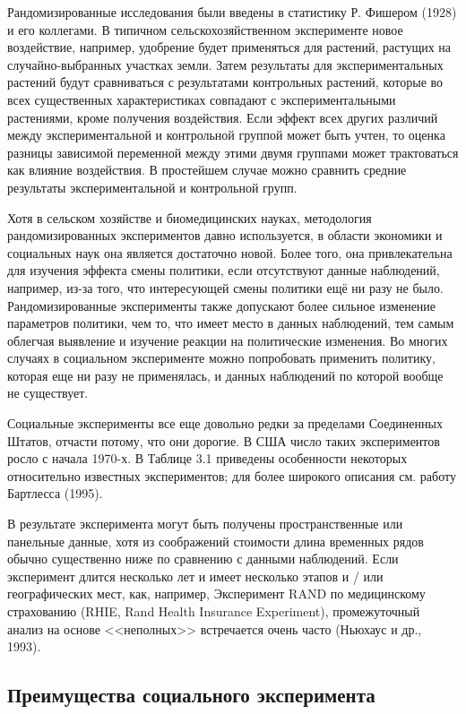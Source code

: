 Рандомизированные исследования были введены в статистику Р. Фишером (1928) и его коллегами. В типичном сельскохозяйственном эксперименте новое воздействие, например, удобрение будет применяться для растений, растущих на случайно-выбранных участках земли. Затем результаты для экспериментальных растений будут сравниваться с результатами контрольных растений, которые во всех существенных характеристиках совпадают с экспериментальными растениями, кроме получения воздействия. 
Если эффект всех других различий между экспериментальной и контрольной группой может быть учтен, то оценка разницы зависимой переменной между этими двумя группами может трактоваться как влияние воздействия. В простейшем случае можно  сравнить средние результаты экспериментальной и контрольной групп.


Хотя в сельском хозяйстве и биомедицинских науках, методология рандомизированных экспериментов давно используется, в области экономики и социальных наук она является достаточно новой. Более того, она привлекательна для изучения эффекта смены политики, если отсутствуют данные наблюдений, например, из-за того, что интересующей смены политики ещё ни разу не было.  Рандомизированные эксперименты также допускают  более сильное изменение параметров  политики, чем то, что имеет место в данных наблюдений, тем самым облегчая выявление и изучение реакции на политические изменения. Во многих случаях в социальном эксперименте можно попробовать применить политику, которая еще ни разу не применялась, и данных наблюдений по которой вообще не существует.


Социальные эксперименты все еще довольно редки за пределами Соединенных Штатов, отчасти потому, что они дорогие. В США число таких экспериментов росло с начала 1970-х. В Таблице 3.1 приведены особенности некоторых относительно известных экспериментов; для более широкого описания см. работу Бартлесса (1995).


В результате эксперимента могут быть получены пространственные или панельные данные,  хотя  из соображений стоимости длина временных рядов обычно существенно ниже по сравнению с данными наблюдений. Если эксперимент длится несколько лет и имеет несколько этапов и / или географических мест, как, например, Эксперимент RAND по медицинскому страхованию (RHIE, Rand Health Insurance Experiment), промежуточный анализ на основе <<неполных>> встречается очень часто (Ньюхаус и др., 1993).



\subsection{Преимущества социального эксперимента}


